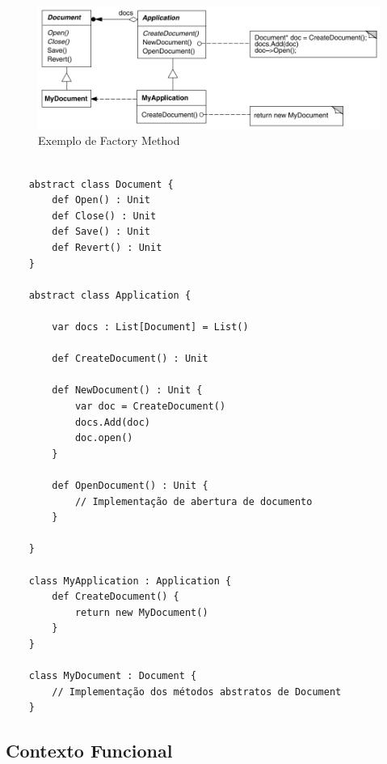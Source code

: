 \begin{figure}[htb]
	\caption{\label{fmethod_example}Exemplo de Factory Method}
	\begin{center}
	    \includegraphics[scale=0.4]{5_padroes-contexto-funcional/5.1_criacionais/5.1.1_factory-method/exemplo_factory.png}
	\end{center}
\end{figure}

\begin{lstlisting}[caption={Factory Method Orientado a Objetos},label=oofactory]
    
    abstract class Document {
        def Open() : Unit
        def Close() : Unit
        def Save() : Unit
        def Revert() : Unit
    }

    abstract class Application {
        
        var docs : List[Document] = List()

        def CreateDocument() : Unit

        def NewDocument() : Unit {
            var doc = CreateDocument()
            docs.Add(doc)
            doc.open()
        }

        def OpenDocument() : Unit {
            // Implementação de abertura de documento
        }

    }

    class MyApplication : Application {
        def CreateDocument() {
            return new MyDocument()
        }
    }

    class MyDocument : Document {
        // Implementação dos métodos abstratos de Document
    }

\end{lstlisting}




\subsection*{Contexto Funcional}

\begin{lstlisting}[caption={Factory Method Funcional},label=fpfactory]
    
    

\end{lstlisting}

